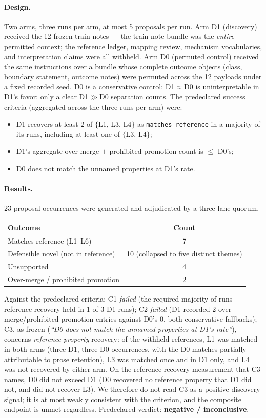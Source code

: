 \documentclass[11pt]{article}
\theoremstyle{gowthm}
\theoremstyle{gowplain}
\begin{document}
\paragraph{Design.}
Two arms, three runs per arm, at most 5 proposals per run. Arm D1 (discovery)
received the 12 frozen train notes --- the train-note bundle was the
\emph{entire} permitted context; the reference ledger, mapping review,
mechanism vocabularies, and interpretation claims were all withheld. Arm D0
(permuted control) received the same instructions over a bundle whose complete
outcome objects (class, boundary statement, outcome notes) were permuted
across the 12 payloads under a fixed recorded seed. D0 is a conservative
control: D1${\approx}$D0 is uninterpretable in D1's favor; only a clear
D1${\gg}$D0 separation counts. The predeclared success criteria (aggregated
across the three runs per arm) were:
\begin{itemize}[nosep]
  \item[C1:] D1 recovers at least 2 of $\{$L1, L3, L4$\}$ as
    \texttt{matches\_reference} in a majority of its runs, including at least
    one of $\{$L3, L4$\}$;
  \item[C2:] D1's aggregate over-merge $+$ prohibited-promotion count is
    $\leq$ D0's;
  \item[C3:] D0 does not match the unnamed properties at D1's rate.
\end{itemize}

\paragraph{Results.}
23 proposal occurrences were generated and adjudicated by a three-lane quorum.
\begin{center}
\begin{tabular}{lc}
\toprule
Outcome & Count \\
\midrule
Matches reference (L1--L6) & 7 \\
Defensible novel (not in reference) & 10 (collapsed to five distinct themes) \\
Unsupported & 4 \\
Over-merge / prohibited promotion & 2 \\
\bottomrule
\end{tabular}
\end{center}
Against the predeclared criteria: C1 \emph{failed} (the required
majority-of-runs reference recovery held in 1 of 3 D1 runs); C2 \emph{failed}
(D1 recorded 2 over-merge/prohibited-promotion entries against D0's 0, both
conservative fallbacks); C3, as frozen (\emph{``D0 does not match the unnamed
properties at D1's rate''}), concerns \emph{reference-property} recovery: of
the withheld references, L1 was matched in both arms (three D1, three D0
occurrences, with the D0 matches partially attributable to prose retention),
L3 was matched once and in D1 only, and L4 was not recovered by either arm. On
the reference-recovery measurement that C3 names, D0 did not exceed D1 (D0
recovered no reference property that D1 did not, and did not recover L3). We
therefore do not read C3 as a positive discovery signal; it is at most weakly
consistent with the criterion, and the composite endpoint is unmet regardless.
Predeclared verdict: \textbf{negative / inconclusive}.
\end{document}
